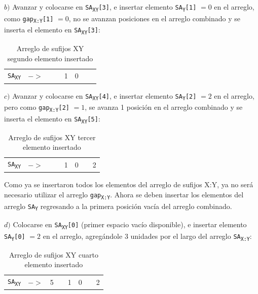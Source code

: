 $b)$ Avanzar y colocarse en \texttt{SA\textsubscript{XY}[3]}, e insertar elemento \texttt{SA\textsubscript{Y}[1]} $= 0$ en el arreglo, como \texttt{gap\textsubscript{X:Y}[1]} $= 0$, no se avanzan posiciones en el arreglo combinado y se inserta el elemento en \texttt{SA\textsubscript{XY}[3]}:

\begin{table}[!hbt]
\centering
\begin{tabular}{cc|c|c|c|c|c|c|}
\cline{3-8}
\texttt{SA\textsubscript{XY}} &  $->$ &  &  & 1 & 0 &  &  \\ \cline{3-8} 
\end{tabular}
\caption{Arreglo de sufijos XY segundo elemento insertado}
\end{table}

$c)$ Avanzar y colocarse en \texttt{SA\textsubscript{XY}[4]}, e insertar elemento \texttt{SA\textsubscript{Y}[2]} $= 2$ en el arreglo, pero como \texttt{gap\textsubscript{X:Y}[2]} $= 1$, se avanza 1 posición en el arreglo combinado y se inserta el elemento en \texttt{SA\textsubscript{XY}[5]}:

\begin{table}[!hbt]
\centering
\begin{tabular}{cc|c|c|c|c|c|c|}
\cline{3-8}
\texttt{SA\textsubscript{XY}} &  $->$ &  &  & 1 & 0 &  & 2 \\ \cline{3-8} 
\end{tabular}
\caption{Arreglo de sufijos XY tercer elemento insertado}
\end{table}

Como ya se insertaron todos los elementos del arreglo de sufijos X:Y, ya no será necesario utilizar el arreglo \texttt{gap\textsubscript{X:Y}}. Ahora se deben insertar los elementos del arreglo \texttt{SA\textsubscript{Y}} regresando a la primera posición vacía del arreglo combinado.

$d)$ Colocarse en \texttt{SA\textsubscript{XY}[0]} (primer espacio vacío disponible), e insertar elemento \texttt{SA\textsubscript{Y}[0]} $= 2$ en el arreglo, agregándole 3 unidades por el largo del arreglo \texttt{SA\textsubscript{X:Y}}:

\begin{table}[!hbt]
\centering
\begin{tabular}{cc|c|c|c|c|c|c|}
\cline{3-8}
\texttt{SA\textsubscript{XY}} &  $->$ & 5 &  & 1 & 0 &  & 2 \\ \cline{3-8} 
\end{tabular}
\caption{Arreglo de sufijos XY cuarto elemento insertado}
\end{table}

